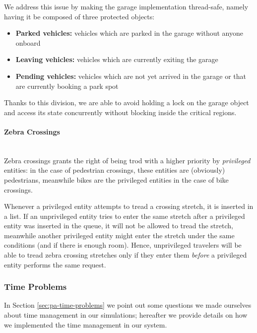 We address this issue by making the garage implementation thread-safe, namely
having it be composed of three protected objects:

\begin{itemize}
  \item \textbf{Parked vehicles:} vehicles which are parked in the garage
    without anyone onboard
  \item \textbf{Leaving vehicles:} vehicles which are currently exiting the
    garage
  \item \textbf{Pending vehicles:} vehicles which are not yet arrived in the
    garage or that are currently booking a park spot
\end{itemize}

Thanks to this division, we are able to avoid holding a lock on the garage
object and access its state concurrently without blocking inside the critical
regions.

\paragraph{Zebra Crossings} \mbox{} \\
Zebra crossings grants the right of being trod with a higher priority by
\textit{privileged} entities: in the case of pedestrian crossings, these
entities are (obviously) pedestrians, meanwhile bikes are the privileged
entities in the case of bike crossings.

Whenever a privileged entity attempts to tread a crossing stretch, it is
inserted in a list. If an unprivileged entity tries to enter the same stretch
after a privileged entity was inserted in the queue, it will not be allowed to
tread the stretch, meanwhile another privileged entity might enter the stretch
under the same conditions (and if there is enough room).
Hence, unprivileged travelers will be able to tread zebra crossing stretches
only if they enter them \textit{before} a privileged entity performs the same
request.



\subsubsection{Time Problems}

In Section \ref{sec:pa-time-problems} we point out some questions we made
ourselves about time management in our simulations; hereafter we provide
details on how we implemented the time management in our system.

